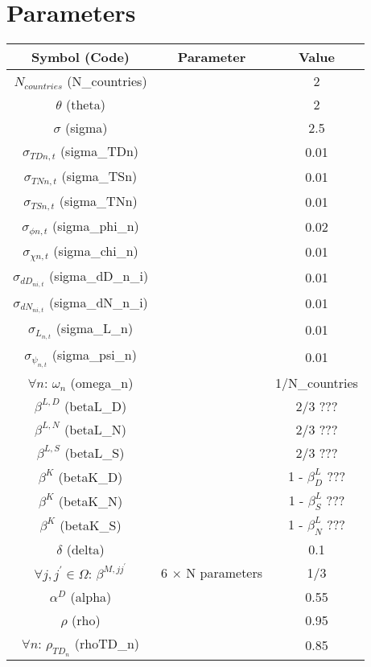 \documentclass[12pt, bibtotoc, tablecaptionabove, figurecaptionabove, fleqn]{article}
\begin{document}
\section{Parameters}
{\small
\begin{center}
	\begin{tabular}{ccc} 
		\hline
		\hline
		Symbol (Code) & Parameter & Value \\ 
		\hline
		$N_{countries}$ (N\_{countries}) & & 2 \\ 		
		$\theta$ (theta) & & 2 \\ 
		$\sigma$ (sigma) & & 2.5 \\
		$\sigma_{TDn,t}$ (sigma\_TDn) & & 0.01 \\
		$\sigma_{TNn,t}$ (sigma\_TSn) & & 0.01 \\
		$\sigma_{TSn,t}$ (sigma\_TNn) & & 0.01 \\
		$\sigma_{\phi n,t}$ (sigma\_phi\_n) & & 0.02 \\				$\sigma_{\chi n,t}$ (sigma\_chi\_n) & & 0.01 \\
                $\sigma_{dD_{ni,t}}$ (sigma\_dD\_n\_i) & & 0.01 \\
                $\sigma_{dN_{ni,t}}$ (sigma\_dN\_n\_i) & & 0.01 \\                
                $\sigma_{L_{n,t}}$ (sigma\_L\_n) & & 0.01 \\
                $\sigma_{\psi_{n,t}}$ (sigma\_psi\_n) & & 0.01 \\		                
		$\forall n$: $\omega_n$ (omega\_n) & & 1/N\_{countries}\\
		$\beta^{L,D}$ (betaL\_D) & & 2/3 ??? \\
                $\beta^{L,N}$ (betaL\_N) & & 2/3 ???\\
                $\beta^{L,S}$ (betaL\_S) & & 2/3 ??? \\                
		$\beta^K$ (betaK\_D) & & 1 - $\beta^L_D$ ???\\
		$\beta^K$ (betaK\_N) & & 1 - $\beta^L_S$ ???\\
		$\beta^K$ (betaK\_S) & & 1 - $\beta^L_N$ ???\\		
		$\delta$ (delta) & & 0.1 \\
		$\forall j, j^{\prime} \in \Omega$: $\beta^{M, j j^{\prime}}$ & 6 $\times$ N parameters & 1/3\\
 		$\alpha^D$ (alpha) & & 0.55 \\ 
		$\rho$ (rho) & & 0.95 \\ 
		$\forall n$: $\rho_{TD_n}$ (rhoTD\_n) & & 0.85 \\ 

\end{tabular}
\end{center}}
\end{document}
